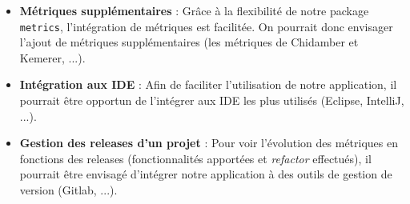 \documentclass{scrartcl}
\begin{document}
\begin{itemize}
        \item \textbf{Métriques supplémentaires} : Grâce à la flexibilité de notre package \texttt{metrics}, l'intégration de métriques est facilitée. On pourrait donc envisager l'ajout de métriques supplémentaires (les métriques de Chidamber et Kemerer, ...).
        
        \item \textbf{Intégration aux IDE} : Afin de faciliter l'utilisation de notre application, il pourrait être opportun de l'intégrer aux IDE les plus utilisés (Eclipse, IntelliJ, ...).
        
        \item \textbf{Gestion des releases d'un projet} : Pour voir l'évolution des métriques en fonctions des releases (fonctionnalités apportées et \emph{refactor} effectués), il pourrait être envisagé d'intégrer notre application à des outils de gestion de version (Gitlab, ...).
       
    \end{itemize}




\pagebreak


\end{document}
